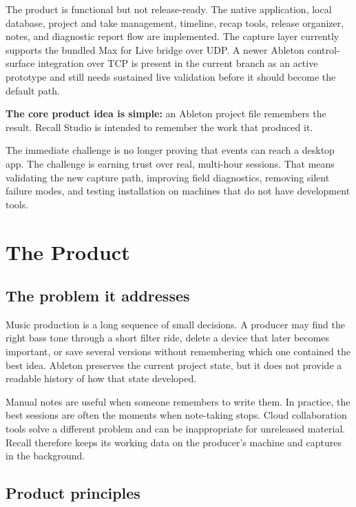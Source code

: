 \documentclass[11pt,letterpaper]{article}
\newcommand{\callout}[1]{%
  \begin{center}
    \setlength{\fboxsep}{10pt}%
    \colorbox{RecallPanel}{%
      \parbox{0.93\linewidth}{\color{RecallInk}#1}%
    }
  \end{center}
}
\begin{document}
The product is functional but not release-ready. The native application, local
database, project and take management, timeline, recap tools, release organizer,
notes, and diagnostic report flow are implemented. The capture layer currently
supports the bundled Max for Live bridge over UDP. A newer Ableton control-surface
integration over TCP is present in the current branch as an active prototype and
still needs sustained live validation before it should become the default path.

\callout{%
  \textbf{The core product idea is simple:} an Ableton project file remembers the
  result. Recall Studio is intended to remember the work that produced it.
}

The immediate challenge is no longer proving that events can reach a desktop app.
The challenge is earning trust over real, multi-hour sessions. That means validating
the new capture path, improving field diagnostics, removing silent failure modes,
and testing installation on machines that do not have development tools.

\section{The Product}

\subsection{The problem it addresses}

Music production is a long sequence of small decisions. A producer may find the
right bass tone through a short filter ride, delete a device that later becomes
important, or save several versions without remembering which one contained the
best idea. Ableton preserves the current project state, but it does not provide a
readable history of how that state developed.

Manual notes are useful when someone remembers to write them. In practice, the
best sessions are often the moments when note-taking stops. Cloud collaboration
tools solve a different problem and can be inappropriate for unreleased material.
Recall therefore keeps its working data on the producer's machine and captures in
the background.

\subsection{Product principles}
\end{document}

